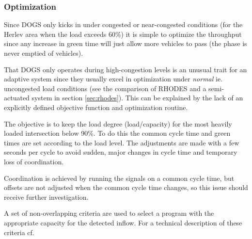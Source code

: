 \subsubsection*{Optimization}

Since DOGS only kicks in under congested or near-congested conditions
(for the Herlev area when the load exceeds 60\%) it is simple to
optimize the throughput since any increase in green time will just
allow more vehicles to pass (the phase is never emptied of vehicles).

That DOGS only operates during high-congestion levels is an unusual
trait for an adaptive system since they usually excel in optimization
under \textit{normal} ie. uncongested load conditions (see the
comparison of RHODES and a semi-actuated system in section
\ref{sec:rhodes}). This can be explained by the lack of an
explicitly defined objective function and optimization routine.

The objective is to keep the load degree (load/capacity) for the most
heavily loaded intersection below 90\%.  To do this the common cycle
time and green times are set according to the load level. The
adjustments are made with a few seconds per cycle to avoid sudden,
major changes in cycle time and temporary loss of coordination.

Coordination is achieved by running the signals on a common cycle
time, but offsets are not adjusted when the common cycle time changes,
so this issue should receive further investigation.

A set of non-overlapping criteria are used to select a program with
the appropriate capacity for the detected inflow. For a technical
description of these criteria cf. \citet{forprojekt}



